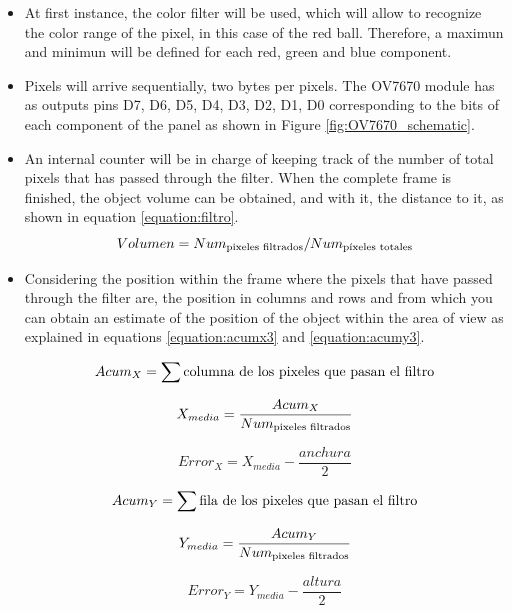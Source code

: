 \begin{itemize}
	\item At first instance, the color filter will be used, which will allow to recognize the color range of the pixel, in this case of the red ball. Therefore, a maximun and minimun will be defined for each red, green and blue component.
	\item Pixels will arrive sequentially, two bytes per pixels. The OV7670 module has as outputs pins D7, D6, D5, D4, D3, D2, D1, D0 corresponding to the bits of each component of the panel as shown in Figure \ref{fig:OV7670_schematic}.
	\item An internal counter will be in charge of keeping track of the number of total pixels that has passed through the filter. When the complete frame is finished, the object volume can be obtained, and with it, the distance to it, as shown in equation \ref{equation:filtro}.
	\begin{equation} \label{equation:filtro}
		Volumen = Num_{\textup{pixeles filtrados}}/Num_{\textup{píxeles totales}}
	\end{equation}
	\item Considering the position within the frame where the pixels that have passed through the filter are, the position in columns and rows and from which you can obtain an estimate of the position of the object within the area of view as explained in equations \ref{equation:acumx3} and \ref{equation:acumy3}.
	
	\begin{equation}\label{equation:acumx}
		Acum_{X} = \sum\textup{columna de los pixeles que pasan el filtro}
	\end{equation}
	
	\begin{equation}\label{equation:acumx2}
		X_{media} = \frac{Acum_{X}}{Num_{\textup{pixeles filtrados}}}
	\end{equation}

	\begin{equation}\label{equation:acumx3}
		Error_{X} = X_{media}- \frac{anchura}{2}
	\end{equation}
	
	\begin{equation}\label{equation:acumy}
		Acum_{Y} = \sum\textup{fila de los pixeles que pasan el filtro}
 	\end{equation}
	
	\begin{equation}\label{equation:acumy2}
		Y_{media} = \frac{Acum_{Y}}{Num_{\textup{pixeles filtrados}}}
	\end{equation}
	
	\begin{equation}\label{equation:acumy3}
		Error_{Y} = Y_{media}- \frac{altura}{2}
	\end{equation}
	
	\end{itemize}

